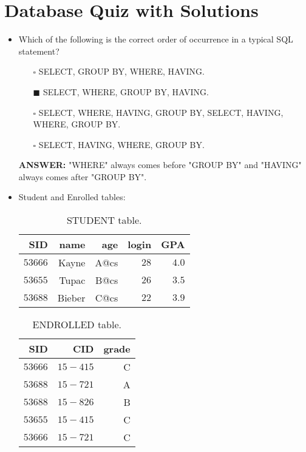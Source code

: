 \documentclass[10pt]{article}
\newcommand{\lightrule}{%
	\arrayrulecolor{black!30}%
	\midrule[\lightrulewidth]%
	\arrayrulecolor{black}}
\begin{document}
	\section{Database Quiz with Solutions}
	\begin{itemize}
		\item Which of the following is the correct order of occurrence in a typical SQL statement?
			\begin{enumerate}
				\item[$\square$] SELECT, GROUP BY, WHERE, HAVING.
				\item[$\blacksquare$] SELECT, WHERE, GROUP BY, HAVING.
				\item[$\square$] SELECT, WHERE, HAVING, GROUP BY, SELECT, HAVING, WHERE, GROUP BY.
				\item[$\square$] SELECT, HAVING, WHERE, GROUP BY.
			\end{enumerate}
			\color{red} \textbf{ANSWER:} \color{black} "WHERE" always comes before "GROUP BY" and "HAVING" always comes after "GROUP BY".

		\item Student and Enrolled tables:
			\begin{table}[H]
				\centering
				\begin{tabular}{@{} *{5}{r} @{}}
					\toprule
						\textbf{SID} & \textbf{name} & \textbf{age} & \textbf{login} & \textbf{GPA} \\
					\midrule
						$53666$ & Kayne & A@cs & $28$ & $4.0$ \\ 
					\lightrule
						$53655$ & Tupac & B@cs & $26$ & $3.5$ \\  
					\lightrule
						$53688$ & Bieber & C@cs & $22$ & $3.9$ \\ 
					\bottomrule
				\end{tabular}
				\caption{STUDENT table.}
			\end{table}

			\begin{table}[H]
				\centering
				\begin{tabular}{@{} *{3}{r} @{}}
					\toprule
						\textbf{SID} & \textbf{CID} & \textbf{grade} \\
					\midrule
						$53666$ & $15-415$ & C \\ 
					\lightrule
						$53688$ & $15-721$ & A \\  
					\lightrule
						$53688$ & $15-826$ & B \\
					\lightrule 
						$53655$ & $15-415$ & C \\ 
					\lightrule 
						$53666$ & $15-721$ & C \\ 
					\bottomrule
				\end{tabular}
				\caption{ENDROLLED table.}
			\end{table}
		

\end{itemize}
\end{document}
